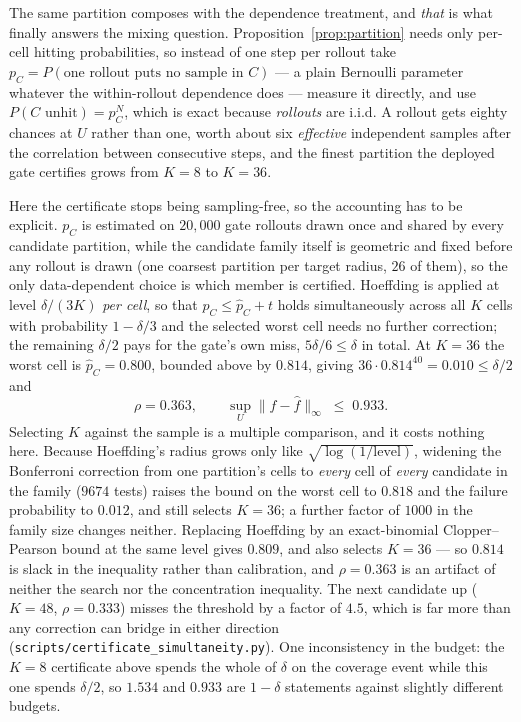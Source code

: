\documentclass[11pt]{article}
\theoremstyle{definition}
\theoremstyle{remark}
\begin{document}
The same partition composes with the dependence treatment, and \emph{that} is what finally answers the mixing question. Proposition~\ref{prop:partition} needs only per-cell hitting probabilities, so instead of one step per rollout take $p_C = P(\text{one rollout puts no sample in } C)$ --- a plain Bernoulli parameter whatever the within-rollout dependence does --- measure it directly, and use $P(C \text{ unhit}) = p_C^N$, which is exact because \emph{rollouts} are i.i.d. A rollout gets eighty chances at $U$ rather than one, worth about six \emph{effective} independent samples after the correlation between consecutive steps, and the finest partition the deployed gate certifies grows from $K = 8$ to $K = 36$.

Here the certificate stops being sampling-free, so the accounting has to be explicit. $p_C$ is estimated on $20{,}000$ gate rollouts drawn once and shared by every candidate partition, while the candidate family itself is geometric and fixed before any rollout is drawn (one coarsest partition per target radius, $26$ of them), so the only data-dependent choice is which member is certified. Hoeffding is applied at level $\delta/(3K)$ \emph{per cell}, so that $p_C \leq \hat p_C + t$ holds simultaneously across all $K$ cells with probability $1 - \delta/3$ and the selected worst cell needs no further correction; the remaining $\delta/2$ pays for the gate's own miss, $5\delta/6 \leq \delta$ in total. At $K = 36$ the worst cell is $\hat p_C = 0.800$, bounded above by $0.814$, giving $36 \cdot 0.814^{40} = 0.010 \leq \delta/2$ and
\[
  \rho = 0.363, \qquad \sup_U \|f - \hat f\|_\infty \;\leq\; \mathbf{0.933}.
\]
Selecting $K$ against the sample is a multiple comparison, and it costs nothing here. Because Hoeffding's radius grows only like $\sqrt{\log(1/\text{level})}$, widening the Bonferroni correction from one partition's cells to \emph{every} cell of \emph{every} candidate in the family ($9674$ tests) raises the bound on the worst cell to $0.818$ and the failure probability to $0.012$, and still selects $K = 36$; a further factor of $1000$ in the family size changes neither. Replacing Hoeffding by an exact-binomial Clopper--Pearson bound at the same level gives $0.809$, and also selects $K = 36$ --- so $0.814$ is slack in the inequality rather than calibration, and $\rho = 0.363$ is an artifact of neither the search nor the concentration inequality. The next candidate up ($K = 48$, $\rho = 0.333$) misses the threshold by a factor of $4.5$, which is far more than any correction can bridge in either direction (\texttt{scripts/\allowbreak certificate\_\allowbreak simultaneity.py}). One inconsistency in the budget: the $K = 8$ certificate above spends the whole of $\delta$ on the coverage event while this one spends $\delta/2$, so $1.534$ and $0.933$ are $1-\delta$ statements against slightly different budgets.
\end{document}
